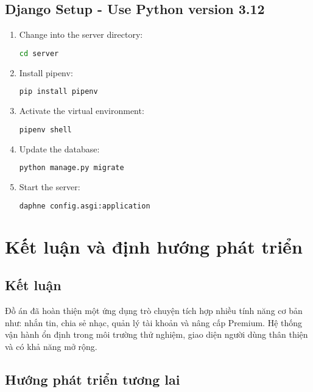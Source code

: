 \documentclass[a4paper]{article}
\begin{document}
\subsection*{Django Setup - Use Python version 3.12}
\begin{enumerate}
  \item Change into the server directory:
  \begin{lstlisting}[language=bash]
  cd server
  \end{lstlisting}
  \item Install pipenv:
  \begin{lstlisting}[language=bash]
  pip install pipenv
  \end{lstlisting}
  
  \item Activate the virtual environment:
  \begin{lstlisting}[language=bash]
  pipenv shell
  \end{lstlisting}
  
  \item Update the database:
  \begin{lstlisting}[language=bash]
  python manage.py migrate
  \end{lstlisting}
  
  \item Start the server:
  \begin{lstlisting}[language=bash]
  daphne config.asgi:application
  \end{lstlisting}
\end{enumerate}

\section{Kết luận và định hướng phát triển}

\subsection{Kết luận}

Đồ án đã hoàn thiện một ứng dụng trò chuyện tích hợp nhiều tính năng cơ bản như: nhắn tin, chia sẻ nhạc, quản lý tài khoản và nâng cấp Premium. Hệ thống vận hành ổn định trong môi trường thử nghiệm, giao diện người dùng thân thiện và có khả năng mở rộng.

\subsection{Hướng phát triển tương lai}
\end{document}
